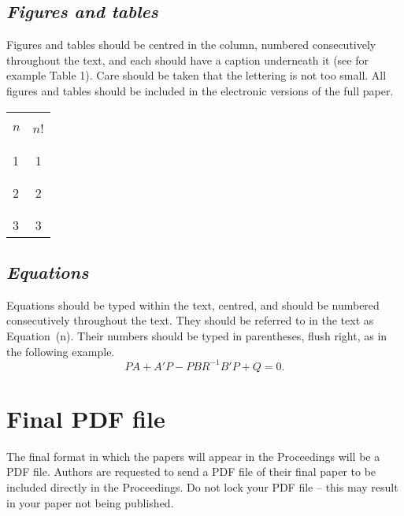 \documentclass[12pt]{IET02}
\begin{document}
\subsection{\it Figures and tables}

Figures and tables should be centred in the column, numbered
consecutively throughout the text, and each should have a caption
underneath it (see for example Table 1). Care should be taken that
the lettering is not too small. All figures and tables should be
included in the electronic versions of the full paper.

\begin{table}[h]%
{\begin{tabular}{@{}|@{\ \ \qquad}l@{\ \ \qquad}|@{\ \ \qquad}c@{\ \ \qquad}|@{}}\hline
 &\\[-.6pc]
$n$ &$n$! \\[-.6pc]
 &\\\hline
 &\\[-.6pc]
1 &1\\[-.6pc]
 &\\\hline
 &\\[-.6pc]
2 &2\\[-.6pc]
 &\\\hline
 &\\[-.6pc]
3 &3\\[.2pc]\hline
\end{tabular}}{}
\end{table}

\subsection{\it Equations}

Equations should be typed within the text, centred, and should be numbered
consecutively throughout the text. They should be referred to in the text as
Equation~(n). Their numbers should be typed in parentheses, flush right, as
in the following example.
\begin{equation}
PA + A'P - PBR^{-1}B'P + Q = 0.
\end{equation}

\section{Final PDF file}

The final format in which the papers will appear in the Proceedings will be
a PDF file. Authors are requested to send a PDF file of their final paper to
be included directly in the Proceedings. Do not lock your PDF file -- this
may result in your paper not being published.
\end{document}
